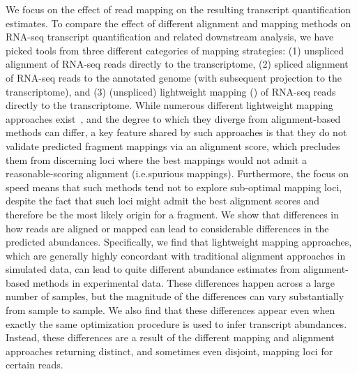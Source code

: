 We focus on the effect of read
mapping on the resulting transcript quantification estimates. To compare the
effect of different alignment and mapping methods on RNA-seq transcript
quantification and related downstream analysis, we have picked tools from three
different categories of mapping strategies: (1) unspliced alignment of RNA-seq reads
directly to the transcriptome, (2) spliced alignment of RNA-seq reads to the
annotated genome (with subsequent projection to the transcriptome), and
(3) (unspliced) lightweight mapping (\qm) of RNA-seq reads directly to the
transcriptome. While numerous different lightweight mapping approaches
exist~\citep{sailfish,rnaskim,kallisto,rapmap,fleximer}, and the degree to which
they diverge from alignment-based methods can differ, a key feature shared by
such approaches is that they do not validate predicted fragment mappings via an
alignment score, which precludes them from discerning loci where the best
mappings would not admit a reasonable-scoring alignment (i.e.\@ spurious
mappings). Furthermore, the focus on speed means that such methods tend not to
explore sub-optimal mapping loci, despite the fact that such loci might admit
the best alignment scores and therefore be the most likely origin for a
fragment. We show that differences in how reads are aligned or mapped can lead
to considerable differences in the predicted abundances. Specifically, we find
that lightweight mapping approaches, %
which are generally highly concordant with traditional alignment approaches in
simulated data, can lead to quite different abundance estimates from
alignment-based methods in experimental data. These differences happen across a
large number of samples, but the magnitude of the differences can vary
substantially from sample to sample. We also find that these differences appear
even when exactly the same optimization procedure is used to infer transcript
abundances.  Instead, these differences are a result of the different mapping and alignment
approaches returning distinct, and sometimes even disjoint, mapping loci for
certain reads.

